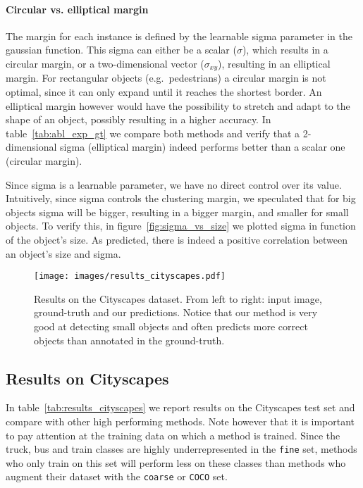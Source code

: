 \paragraph{Circular vs. elliptical margin}
The margin for each instance is defined by the learnable sigma parameter in the gaussian function. This sigma can either be a scalar ($\sigma$), which results in a circular margin, or a two-dimensional vector ($\sigma_{xy}$), resulting in an elliptical margin. For rectangular objects (e.g.~pedestrians) a circular margin is not optimal, since it can only expand until it reaches the shortest border. An elliptical margin however would have the possibility to stretch and adapt to the shape of an object, possibly resulting in a higher accuracy. In table~\ref{tab:abl_exp_gt} we compare both methods and verify that a 2-dimensional sigma (elliptical margin) indeed performs better than a scalar one (circular margin).

Since sigma is a learnable parameter, we have no direct control over its value. Intuitively, since sigma controls the clustering margin, we speculated that for big objects sigma will be bigger, resulting in a bigger margin, and smaller for small objects. To verify this, in figure~\ref{fig:sigma_vs_size} we plotted sigma in function of the object's size. As predicted, there is indeed a positive correlation between an object's size and sigma.

\begin{figure*}
    \begin{center}
    	\texttt{[image: images/results\_cityscapes.pdf]}
    \end{center}
    \caption{Results on the Cityscapes dataset. From left to right: input image, ground-truth and our predictions. Notice that our method is very good at detecting small objects and often predicts more correct objects than annotated in the ground-truth.}
    \label{fig:results}
\end{figure*}

\subsection{Results on Cityscapes}
In table~\ref{tab:results_cityscapes} we report results on the Cityscapes test set and compare with other high performing methods. Note however that it is important to pay attention at the training data on which a method is trained. Since the truck, bus and train classes are highly underrepresented in the \texttt{fine} set, methods who only train on this set will perform less on these classes than methods who augment their dataset with the \texttt{coarse} or \texttt{COCO} set. 

